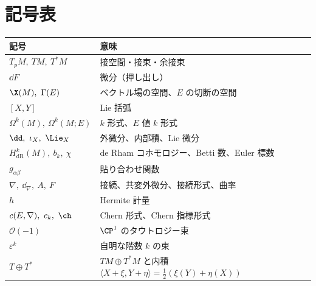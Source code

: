 \section*{記号表}
\begin{center}
\begin{tabular}{ll}
\toprule
記号 & 意味\\
\midrule
$T_pM,\ TM,\ T^*M$ & 接空間・接束・余接束\\
$\dd F$ & 微分（押し出し）\\
$\X(M),\ \Gamma(E)$ & ベクトル場の空間、$E$ の切断の空間\\
$[X,Y]$ & Lie 括弧\\
$\Omega^k(M),\ \Omega^k(M;E)$ & $k$ 形式、$E$ 値 $k$ 形式\\
$\dd,\ \iota_X,\ \Lie_X$ & 外微分、内部積、Lie 微分\\
$H^k_{\mathrm{dR}}(M),\ b_k,\ \chi$ & de Rham コホモロジー、Betti 数、Euler 標数\\
$g_{\alpha\beta}$ & 貼り合わせ関数\\
$\nabla,\ \dd_\nabla,\ A,\ F$ & 接続、共変外微分、接続形式、曲率\\
$h$ & Hermite 計量\\
$c(E,\nabla),\ c_k,\ \ch$ & Chern 形式、Chern 指標形式\\
$\mathcal O(-1)$ & $\CP^1$ のタウトロジー束\\
$\varepsilon^k$ & 自明な階数 $k$ の束\\
$T\oplus T^*$ & $TM\oplus T^*M$ と内積 $\langle X+\xi,Y+\eta\rangle=\frac12(\xi(Y)+\eta(X))$\\
\bottomrule
\end{tabular}
\end{center}

